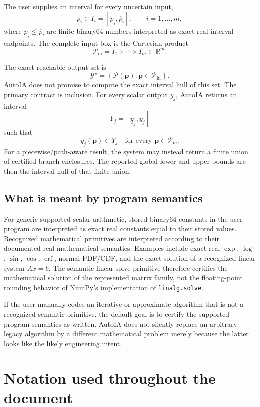 \documentclass[11pt]{article}
\newcommand{\R}{\mathbb{R}}
\newcommand{\Pin}{\mathcal{P}_{\mathrm{in}}}
\newcommand{\Yset}{\mathcal{Y}}
\newcommand{\pv}{\mathbf{p}}
\begin{document}
The user supplies an interval for every uncertain input,
\[
  p_i\in I_i=[\underline p_i,\overline p_i],
  \qquad i=1,\ldots,m,
\]
where \(\underline p_i\le \overline p_i\) are finite binary64 numbers interpreted
as exact real interval endpoints.  The complete input box is the Cartesian
product
\[
  \Pin=I_1\times\cdots\times I_m\subset\R^m.
\]

The exact reachable output set is
\[
  \Yset^\star
  =\left\{\mathcal{P}(\pv):\pv\in\Pin\right\}.
\]
AutoIA does not promise to compute the exact interval hull of this set.  The
primary contract is inclusion.  For every scalar output \(y_j\), AutoIA returns
an interval
\[
  Y_j=[\underline y_j,\overline y_j]
\]
such that
\[
  \boxed{
  y_j(\pv)\in Y_j
  \quad\text{for every }\pv\in\Pin.
  }
\]
For a piecewise/path-aware result, the system may instead return a finite union
of certified branch enclosures.  The reported global lower and upper bounds are
then the interval hull of that finite union.

\subsection{What is meant by program semantics}

For generic supported scalar arithmetic, stored binary64 constants in the user
program are interpreted as exact real constants equal to their stored values.
Recognized mathematical primitives are interpreted according to their documented
real mathematical semantics.  Examples include exact real \(\exp\), \(\log\),
\(\sin\), \(\cos\), \(\operatorname{erf}\), normal PDF/CDF, and the exact solution
of a recognized linear system \(A x=b\).  The semantic linear-solve primitive
therefore certifies the mathematical solution of the represented matrix family,
not the floating-point rounding behavior of NumPy's implementation of
\texttt{linalg.solve}.

If the user manually codes an iterative or approximate algorithm that is not a
recognized semantic primitive, the default goal is to certify the supported
program semantics as written.  AutoIA does not silently replace an arbitrary
legacy algorithm by a different mathematical problem merely because the latter
looks like the likely engineering intent.

\section{Notation used throughout the document}
\end{document}
